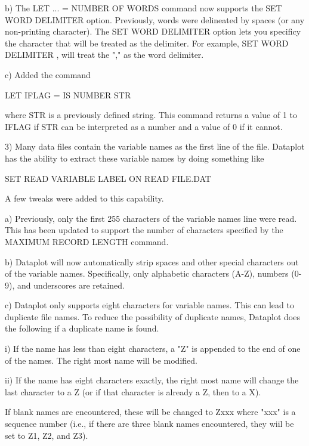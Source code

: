    b) The LET ... = NUMBER OF WORDS command now supports the 
       SET WORD DELIMITER option.  Previously, words were delineated by
       spaces (or any non-printing character).  The SET WORD DELIMITER
       option lets you specificy the character that will be treated as
       the delimiter.  For example, SET WORD DELIMITER , will treat
       the "," as the word delimiter.

     c) Added the command

           LET IFLAG = IS NUMBER STR

        where STR is a previously defined string.  This command
        returns a value of 1 to IFLAG if STR can be interpreted as a
        number and a value of 0 if it cannot.

 3) Many data files contain the variable names as the first line of the
    file.  Dataplot has the ability to extract these variable names by
    doing something like

        SET READ VARIABLE LABEL ON
        READ FILE.DAT

    A few tweaks were added to this capability.

    a) Previously, only the first 255 characters of the variable names
       line were read.  This has been updated to support the number
       of characters specified by the MAXIMUM RECORD LENGTH command.

    b) Dataplot will now automatically strip spaces and other special
       characters out of the variable names.  Specifically, only
       alphabetic characters (A-Z), numbers (0-9), and underscores are
       retained.

    c) Dataplot only supports eight characters for variable names.  This
       can lead to duplicate file names.  To reduce the possibility of
       duplicate names, Dataplot does the following if a duplicate name
       is found.

          i) If the name has less than eight characters, a "Z" is appended
             to the end of one of the names.  The right most name will
             be modified.

         ii) If the name has eight characters exactly, the right most
             name will change the last character to a Z (or if that
             character is already a Z, then to a X).

       If blank names are encountered, these will be changed to
       Zxxx where "xxx" is a sequence number (i.e., if there are three
       blank names encountered, they wiil be set to Z1, Z2, and Z3).

